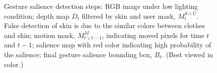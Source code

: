 \documentclass{sig-alternate-2013}
\begin{document}
\begin{figure}[tb]
\centering
\hspace{-0.6em}%
\caption{Gesture salience detection steps:  RGB image under low lighting condition;
 depth map $D_t$ filtered by skin and user mask, $M_t^{S\wedge U}$. False detection of skin is due to
the similar colors between clothes and skin;  motion mask,  $M_{t\vee t-1}^M$, indicating moved pixels for time $t$ and $t-1$;
 salience map with red color indicating high probability of the salience; 
 final gesture salience bounding box, $B_t$. (Best viewed in
color.)}
\label{fig:gesture-salience}
\end{figure}
\end{document}
